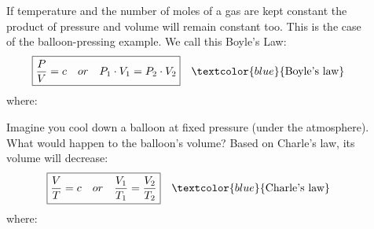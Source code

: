 \documentclass[main.tex]{subfiles}
\begin{document}
\begin{description}
\item[] 
If temperature and the number of moles of a gas are kept constant the product of pressure and volume will remain constant too. This is the case of the balloon-pressing example. We call this Boyle's Law:
\begin{equation*}
\boxed{ \frac{P} {V}=c \quad or \quad   P_1\cdot V_1=P_2\cdot V_2} \quad \textcolor{blue}{\text{Boyle's law}}
\end{equation*}
where:
\item[] 
Imagine you cool down a balloon at fixed pressure (under the atmosphere). What would happen to the balloon's volume? Based on Charle's law, its volume will decrease:
\begin{equation*}
\boxed{\frac{V} {T}=c \quad or \quad   \frac{V_1} {T_1}=\frac{V_2} {T_2}} \quad \textcolor{blue}{\text{Charle's law}}
\end{equation*}
where:




\end{description}
\end{document}

